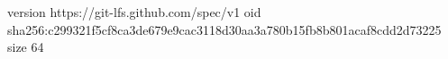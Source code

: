 version https://git-lfs.github.com/spec/v1
oid sha256:c299321f5cf8ca3de679e9cac3118d30aa3a780b15fb8b801acaf8cdd2d73225
size 64
